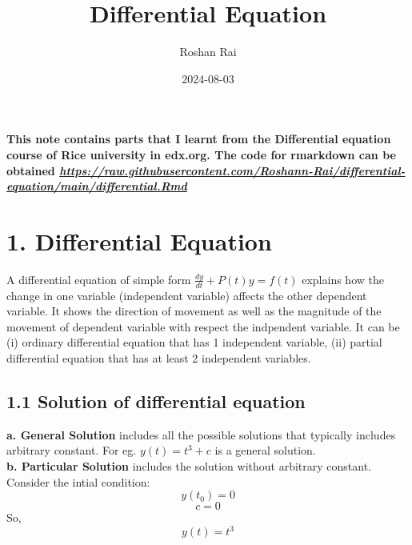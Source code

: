 \documentclass[
  11pt,
]{article}
\title{Differential Equation}
\author{Roshan Rai}
\date{2024-08-03}
\begin{document}
\maketitle

\onehalfspacing

\textbf{This note contains parts that I learnt from the Differential
equation course of Rice university in edx.org. The code for rmarkdown
can be obtained
\href{https://raw.githubusercontent.com/Roshann-Rai/differential-equation/main/differential.Rmd}{\emph{https://raw.githubusercontent.com/Roshann-Rai/differential-equation/main/differential.Rmd}}}

\section{1. Differential Equation}\label{differential-equation}

A differential equation of simple form \(\frac{dy}{dt} + P(t)y = f(t)\)
explains how the change in one variable (independent variable) affects
the other dependent variable. It shows the direction of movement as well
as the magnitude of the movement of dependent variable with respect the
indpendent variable. It can be (i) ordinary differential equation that
has 1 independent variable, (ii) partial differential equation that has
at least 2 independent variables.

\subsection{1.1 Solution of differential
equation}\label{solution-of-differential-equation}

\textbf{a. General Solution} includes all the possible solutions that
typically includes arbitrary constant. For eg. \(y(t) = t^3 + c\) is a
general solution.\\
\textbf{b. Particular Solution} includes the solution without arbitrary
constant. Consider the intial condition: \[y(t_0) = 0\] \[c = 0\] So,
\[y(t) = t^3\] \clearpage
\end{document}
